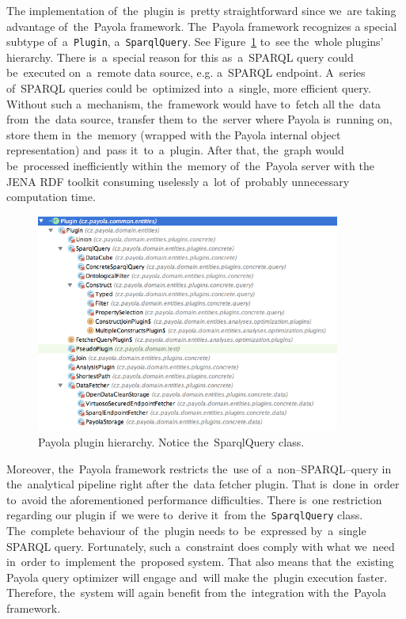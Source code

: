 The implementation of~the~plugin is~pretty straightforward since we~are 
taking advantage of~the~Payola framework. The~Payola framework recognizes a
special subtype of~a~\texttt{Plugin}, a~\texttt{SparqlQuery}. See 
Figure~\ref{fig:plugin-hierarchy} to~see the~whole plugins’ hierarchy. There is~a~special 
reason for this as~a~SPARQL query could be~executed on~a~remote data source, 
e.g. a~SPARQL endpoint. A~series of~SPARQL queries could be~optimized into~a~single,
more efficient query. Without such a~mechanism, the~framework would
have to~fetch all the~data from~the~data source, transfer them to~the~server 
where Payola is~running on, store them in~the~memory (wrapped with
the Payola internal object representation) and~pass it~to~a~plugin. After that, the~graph would be~processed inefficiently within the~memory of~the~Payola server with 
the JENA RDF toolkit consuming uselessly a~lot of~probably unnecessary computation time. 



\begin{figure}
	\centering
	\includegraphics[width=100mm]{img/plugin-hierarchy.png}
	\caption{Payola plugin hierarchy. Notice the~SparqlQuery class.}
	\label{fig:plugin-hierarchy}
\end{figure}

Moreover, the~Payola framework restricts the~use of~a~non--SPARQL--query 
in the~analytical pipeline right after the~data fetcher plugin. That is~done in~order to~avoid 
the aforementioned performance difficulties. There is~one restriction regarding our plugin if~we
were to~derive it~from the~\texttt{SparqlQuery} class. The~complete behaviour of~the~plugin needs to~be~expressed by~a~single SPARQL query. Fortunately, such a~constraint does 
comply with what we~need in~order to~implement the~proposed system. That also means
that the~existing Payola query optimizer will engage and~will make the~plugin execution faster. Therefore, the~system will again 
benefit from the~integration with the~Payola framework.

